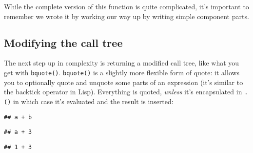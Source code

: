 While the complete version of this function is quite complicated, it's
important to remember we wrote it by working our way up by writing
simple component parts.

\hypertarget{modifying-code}{%
\subsection{Modifying the call tree}\label{modifying-code}}

The next step up in complexity is returning a modified call tree, like
what you get with \texttt{bquote()}. \texttt{bquote()} is a slightly
more flexible form of quote: it allows you to optionally quote and
unquote some parts of an expression (it's similar to the backtick
operator in Lisp). Everything is quoted, \emph{unless} it's encapsulated
in \texttt{.()} in which case it's evaluated and the result is inserted:

\begin{Shaded}
\begin{Highlighting}[]
\StringTok{ }
\StringTok{ }
\OperatorTok{+}\StringTok{ }
\end{Highlighting}
\end{Shaded}

\begin{verbatim}
## a + b
\end{verbatim}

\begin{Shaded}
\begin{Highlighting}[]
\OperatorTok{+}\StringTok{ }
\end{Highlighting}
\end{Shaded}

\begin{verbatim}
## a + 3
\end{verbatim}

\begin{Shaded}
\begin{Highlighting}[]
\OperatorTok{+}\StringTok{ }
\end{Highlighting}
\end{Shaded}

\begin{verbatim}
## 1 + 3
\end{verbatim}

\begin{Shaded}
\begin{Highlighting}[]
\OperatorTok{+}\StringTok{ }
\end{Highlighting}
\end{Shaded}

